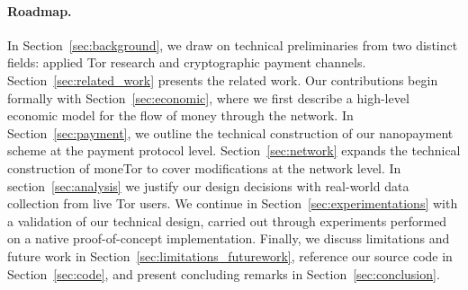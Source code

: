 \paragraph*{Roadmap.} In Section~\ref{sec:background}, we draw on technical
preliminaries from two distinct fields: applied Tor research and cryptographic
payment channels. Section~\ref{sec:related_work} presents the related work. Our
contributions begin formally with Section~\ref{sec:economic}, where we first
describe a high-level economic model for the flow of money through the
network. In Section~\ref{sec:payment}, we outline the technical construction of
our nanopayment scheme at the payment protocol level. Section~\ref{sec:network}
expands the technical construction of moneTor to cover modifications at the
network level. In section~\ref{sec:analysis} we justify our design decisions
with real-world data collection from live Tor users. We continue in
Section~\ref{sec:experimentations} with a validation of our technical design,
carried out through experiments performed on a native proof-of-concept
implementation. Finally, we discuss limitations and future work in
Section~\ref{sec:limitations_futurework}, reference our source code in
Section~\ref{sec:code}, and present concluding remarks in
Section~\ref{sec:conclusion}.

